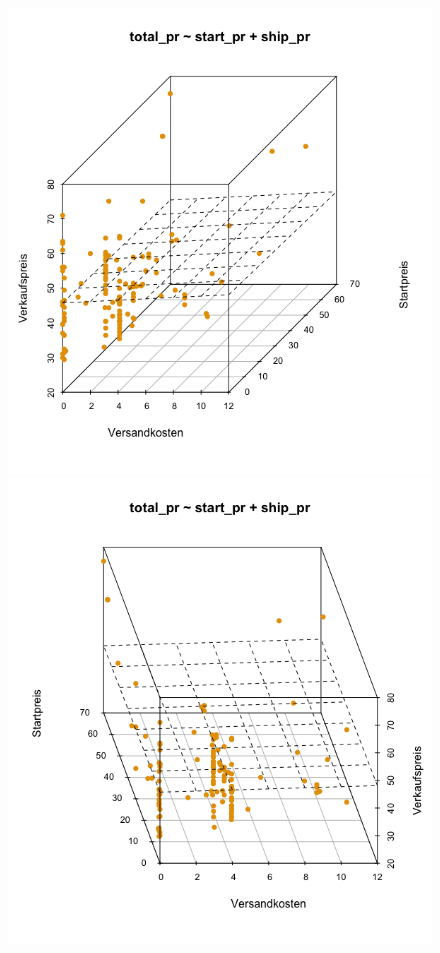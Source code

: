 \documentclass[
  a4paper,
]{scrbook}
\theoremstyle{definition}
\theoremstyle{definition}
\theoremstyle{definition}
\theoremstyle{remark}
\begin{document}
\begin{figure}

\begin{minipage}{0.33\linewidth}

\includegraphics{img/3d_scatter_mario1.png}

\end{minipage}%
%
\begin{minipage}{0.33\linewidth}

\includegraphics{img/3d_scatter_mario2.png}


\end{minipage}
\end{figure}
\end{document}
